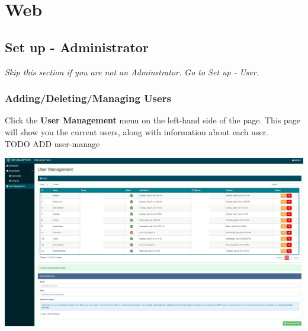   \section{Web}
  \subsection{Set up - Administrator}
  \emph{Skip this section if you are not an Adminstrator. Go to Set up - User.}\\
  \subsubsection{Adding/Deleting/Managing Users}
    Click the \textbf{User Management} menu on the left-hand side of the page.  This page will
      show you the current users, along with information about each user.\\
TODO ADD user-manage
      \begin{center}
      \includegraphics[scale=.15]{images/user-manage.png}
    \end{center}
